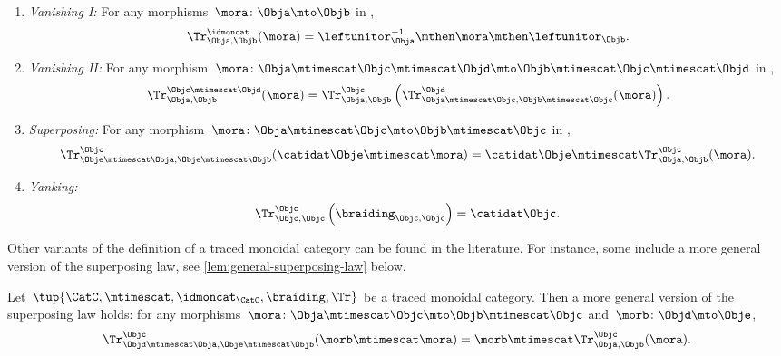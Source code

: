 \begin{ctdefinition}
\begin{enumerate}
        \item \emph{Vanishing I:}
              For any morphisms~$\mora \colon \Obja\mto \Objb$ in \CatC,
              \begin{equation}
                  \label{eq:vanishing_1}
                  \Tr_{\Obja,\Objb}^\idmoncat (\mora)= \leftunitor^{-1}_{\Obja} \mthen \mora \mthen \leftunitor_\Objb.
              \end{equation}
        \item \emph{Vanishing II:}
              For any morphism~$\mora \colon \Obja\mtimescat \Objc \mtimescat \Objd \mto \Objb\mtimescat \Objc \mtimescat \Objd$ in \CatC,
              \begin{equation}
                  \label{eq:vanishing_2}
                  \Tr_{\Obja,\Objb}^{\Objc\mtimescat \Objd}(\mora)=\Tr_{\Obja,\Objb}^\Objc\left(
                  \Tr_{\Obja \mtimescat \Objc , \Objb \mtimescat \Objc}^\Objd(\mora)\right).
              \end{equation}
        \item \emph{Superposing:}
              For any morphism~$\mora\colon \Obja\mtimescat \Objc \mto \Objb\mtimescat \Objc$ in \CatC,
              \begin{equation}
                  \label{eq:superposing}
                  \Tr_{\Obje\mtimescat \Obja,\Obje\mtimescat \Objb}^{\Objc}(\catidat\Obje\mtimescat \mora)=\catidat\Obje\mtimescat \Tr_{\Obja,\Objb}^\Objc(\mora).
              \end{equation}
        \item \emph{Yanking:}
              \begin{equation}
                  \label{eq:yanking}
                  \Tr_{\Objc,\Objc}^\Objc\left(\braiding_{\Objc,\Objc}\right)=\catidat\Objc.
              \end{equation}
    \end{enumerate}
\end{ctdefinition}

\begin{remark}
    Other variants of the definition of a traced monoidal category can be found in the literature.
    For instance, some include a more general version of the superposing law, see \cref{lem:general-superposing-law} below.
\end{remark}

\begin{lemma}
    \label{lem:general-superposing-law}
    Let~$\tup{\CatC,\mtimescat,\idmoncat_{\CatC}, \braiding, \Tr}$ be a traced monoidal category.
    Then a more general version of the superposing law holds: for any morphisms~$\mora\colon \Obja\mtimescat \Objc \mto \Objb \mtimescat \Objc$ and~$\morb \colon \Objd \mto \Obje$,
    \begin{equation}
        \label{eq:superposing_2}
        \Tr_{\Objd\mtimescat \Obja,\Obje\mtimescat \Objb}^{\Objc}(\morb \mtimescat \mora)=\morb \mtimescat \Tr_{\Obja,\Objb}^\Objc(\mora).
    \end{equation}
\end{lemma}
\missingproof


